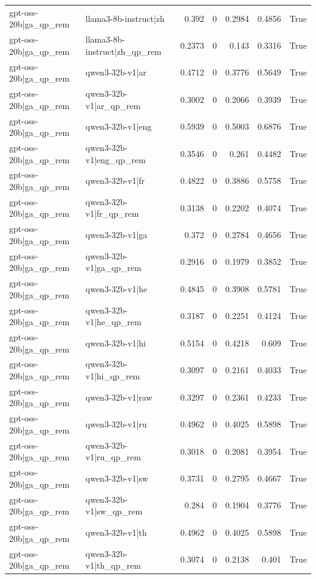 \begin{table}
\begin{tabular}{l l r r r r l}
gpt-oss-20b|ga_qp_rem & llama3-8b-instruct|zh & 0.392 & 0 & 0.2984 & 0.4856 & True \\
gpt-oss-20b|ga_qp_rem & llama3-8b-instruct|zh_qp_rem & 0.2373 & 0 & 0.143 & 0.3316 & True \\
gpt-oss-20b|ga_qp_rem & qwen3-32b-v1|ar & 0.4712 & 0 & 0.3776 & 0.5649 & True \\
gpt-oss-20b|ga_qp_rem & qwen3-32b-v1|ar_qp_rem & 0.3002 & 0 & 0.2066 & 0.3939 & True \\
gpt-oss-20b|ga_qp_rem & qwen3-32b-v1|eng & 0.5939 & 0 & 0.5003 & 0.6876 & True \\
gpt-oss-20b|ga_qp_rem & qwen3-32b-v1|eng_qp_rem & 0.3546 & 0 & 0.261 & 0.4482 & True \\
gpt-oss-20b|ga_qp_rem & qwen3-32b-v1|fr & 0.4822 & 0 & 0.3886 & 0.5758 & True \\
gpt-oss-20b|ga_qp_rem & qwen3-32b-v1|fr_qp_rem & 0.3138 & 0 & 0.2202 & 0.4074 & True \\
gpt-oss-20b|ga_qp_rem & qwen3-32b-v1|ga & 0.372 & 0 & 0.2784 & 0.4656 & True \\
gpt-oss-20b|ga_qp_rem & qwen3-32b-v1|ga_qp_rem & 0.2916 & 0 & 0.1979 & 0.3852 & True \\
gpt-oss-20b|ga_qp_rem & qwen3-32b-v1|he & 0.4845 & 0 & 0.3908 & 0.5781 & True \\
gpt-oss-20b|ga_qp_rem & qwen3-32b-v1|he_qp_rem & 0.3187 & 0 & 0.2251 & 0.4124 & True \\
gpt-oss-20b|ga_qp_rem & qwen3-32b-v1|hi & 0.5154 & 0 & 0.4218 & 0.609 & True \\
gpt-oss-20b|ga_qp_rem & qwen3-32b-v1|hi_qp_rem & 0.3097 & 0 & 0.2161 & 0.4033 & True \\
gpt-oss-20b|ga_qp_rem & qwen3-32b-v1|raw & 0.3297 & 0 & 0.2361 & 0.4233 & True \\
gpt-oss-20b|ga_qp_rem & qwen3-32b-v1|ru & 0.4962 & 0 & 0.4025 & 0.5898 & True \\
gpt-oss-20b|ga_qp_rem & qwen3-32b-v1|ru_qp_rem & 0.3018 & 0 & 0.2081 & 0.3954 & True \\
gpt-oss-20b|ga_qp_rem & qwen3-32b-v1|sw & 0.3731 & 0 & 0.2795 & 0.4667 & True \\
gpt-oss-20b|ga_qp_rem & qwen3-32b-v1|sw_qp_rem & 0.284 & 0 & 0.1904 & 0.3776 & True \\
gpt-oss-20b|ga_qp_rem & qwen3-32b-v1|th & 0.4962 & 0 & 0.4025 & 0.5898 & True \\
gpt-oss-20b|ga_qp_rem & qwen3-32b-v1|th_qp_rem & 0.3074 & 0 & 0.2138 & 0.401 & True \\

\end{tabular}
\end{table}
